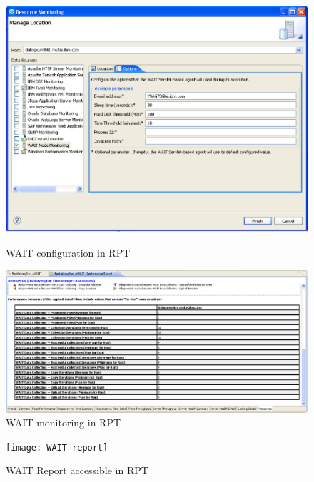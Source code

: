\documentclass[runningheads,a4paper]{llncs}
\begin{document}
\begin{figure}
\centering
\begin{minipage}[b]{.45\textwidth}

\centering
\includegraphics[totalheight=.3\textheight,width=1.0\textwidth]{WAIT-config}
\caption{WAIT configuration in RPT}
\label{fig_config}

\end{minipage}\qquad
\begin{minipage}[b]{.45\textwidth}

\centering
\includegraphics[totalheight=.3\textheight,width=1.0\textwidth]{WAIT-monitoring}
\caption{WAIT monitoring in RPT}
\label{fig_mon}

\end{minipage}
\end{figure}

\begin{figure}[!h]
\centering
\texttt{[image: WAIT-report]}
\caption{WAIT Report accessible in RPT}
\label{fig_report}
\end{figure}
\end{document}
